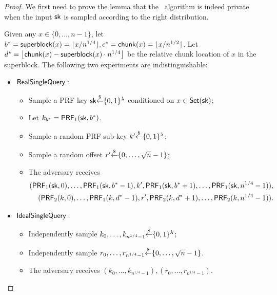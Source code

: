 \begin{proof}
    We first need to prove the lemma that the \SingleQuery~algorithm is indeed private when the input $\mathsf{sk}$ is sampled according to the right distribution.
    
    \begin{lemma}
        \label{lem:privacy-single}
        Given any $x\in\{0,\dots,n-1\}$, let $b^*={\sf superblock}(x)=\lfloor x/n^{1/4} \rfloor, c^* = {\sf chunk}(x)=\lfloor x/n^{1/2} \rfloor$. Let $d^*=\left\lfloor\mathsf{chunk}(x)-\mathsf{superblock}(x)\cdot {n^{1/4}}\right\rfloor$ be the relative chunk location of $x$ in the superblock. 
        The following two experiments are indistinguishable:
        
        \begin{itemize}
            \item ${\sf RealSingleQuery:}$ 
            \begin{itemize}
                \item Sample a PRF key $\mathsf{sk}{\overset{\$}{\leftarrow}}\{0,1\}^\lambda$ conditioned on $x\in\mathsf{Set}(\mathsf{sk})$;
                \item Let $k_{b^*}=\mathsf{PRF}_1(\mathsf{sk}, b^*)$.
                \item Sample a random PRF sub-key $k'{\overset{\$}{\leftarrow}}\{0,1\}^\lambda$;
                \item Sample a random offset $r'{\overset{\$}{\leftarrow}}\{0,\dots,\sqrt{n}-1\}$;
                \item The adversary receives
                \begin{align*}
                    (\mathsf{PRF}_1(\mathsf{sk}, 0),\dots,\mathsf{PRF}_1(\mathsf{sk}, b^*-1),k', \mathsf{PRF}_1(\mathsf{sk}, b^*+1),\dots,\mathsf{PRF}_1(\mathsf{sk}, n^{1/4}-1)),\\
                    (\mathsf{PRF}_2(k, 0),\dots,\mathsf{PRF}_1(k, d^*-1),r', \mathsf{PRF}_2(k, d^*+1),\dots,\mathsf{PRF}_2(k, n^{1/4}-1)).
                \end{align*}
            \end{itemize}
            
            \item ${\sf IdealSingleQuery:}$
            \begin{itemize}
                \item Independently sample $k_0,\dots,k_{n^{1/4}-1}{\overset{\$}{\leftarrow}}\{0,1\}^\lambda$;
                \item Independently sample $r_0,\dots,r_{n^{1/4}-1}{\overset{\$}{\leftarrow}}\{0,\dots,\sqrt{n}-1\}$.
                \item The adversary receives $(k_0,\dots,k_{n^{1/4}-1}),
                (r_0,\dots,r_{n^{1/4}-1})$.
            \end{itemize}
            

\end{itemize}
\end{lemma}
\end{proof}
